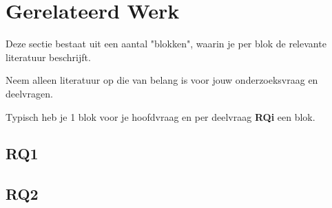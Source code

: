 \section{Gerelateerd Werk}
\label{sec:rel}

Deze sectie bestaat uit een aantal "blokken", waarin je per blok de relevante literatuur beschrijft. 

Neem alleen literatuur op die van belang is voor jouw onderzoeksvraag en deelvragen.

Typisch heb je 1 blok voor je hoofdvraag en per deelvraag \textbf{RQi} een blok. 


\subsection{RQ1}

\subsection{RQ2}